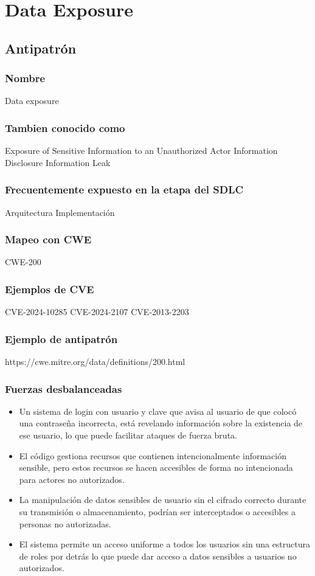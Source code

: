 \chapter{Data Exposure}
\section{Antipatrón}
\subsection*{Nombre}
Data exposure
\subsection*{Tambien conocido como}
Exposure of Sensitive Information to an Unauthorized Actor
Information Disclosure
Information Leak
\subsection*{Frecuentemente expuesto en la etapa del SDLC}
Arquitectura
Implementación
\subsection*{Mapeo con CWE}
CWE-200
\subsection*{Ejemplos de CVE}
CVE-2024-10285
CVE-2024-2107
CVE-2013-2203 
\subsection*{Ejemplo de antipatrón}
https://cwe.mitre.org/data/definitions/200.html
\subsection*{Fuerzas desbalanceadas}
\begin{itemize}
    \item Un sistema de login con usuario y clave que avisa al usuario de que colocó una contraseña incorrecta, está revelando información sobre la existencia de ese usuario, lo que puede facilitar ataques de fuerza bruta.
    \item El código gestiona recursos que contienen intencionalmente información sensible, pero estos recursos se hacen accesibles de forma no intencionada para actores no autorizados. 
    \item La manipulación de datos sensibles de usuario sin el cifrado correcto durante su transmisión o almacenamiento, podrían ser interceptados o accesibles a personas no autorizadas. 
    \item El sistema permite un acceso uniforme a todos los usuarios sin una estructura de roles por detrás lo que puede dar acceso a datos sensibles a usuarios no autorizados.
\end{itemize}
